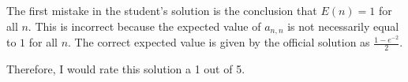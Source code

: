 The first mistake in the student's solution is the conclusion that $E(n) = 1$ for all $n$. This is incorrect because the expected value of $a_{n,n}$ is not necessarily equal to $1$ for all $n$. The correct expected value is given by the official solution as $\frac{1-e^{-2}}{2}$.

Therefore, I would rate this solution a 1 out of 5.
